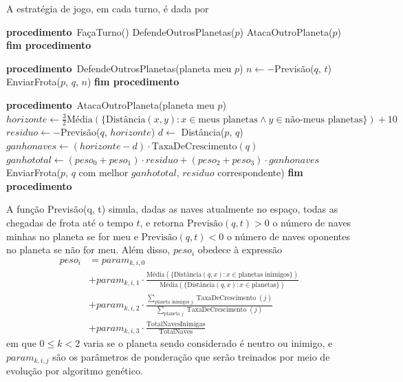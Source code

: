 \documentclass[a4paper,titlepage,11pt]{article}
\newcommand\PROC{\STATE\textbf{procedimento}\ }
\newcommand\ENDPROC{\STATE\textbf{fim procedimento}}
\begin{document}
A estratégia de jogo, em cada turno, é dada por

\begin{algorithmic}[1]
	\PROC FaçaTurno()
	\FORALL {planeta meu $p$}
		\STATE DefendeOutrosPlanetas($p$)
		\STATE AtacaOutroPlaneta($p$)
	\ENDFOR
	\ENDPROC
\end{algorithmic}
\begin{algorithmic}[1]
	\PROC DefendeOutrosPlanetas(planeta meu $p$)
			\STATE $n \gets  -$Previsão($q$, $t$)
				\STATE EnviarFrota($p$, $q$, $n$)
			\ENDIF
		\ENDIF
	\ENDFOR
	\ENDPROC
\end{algorithmic}
\begin{algorithmic}[1]
	\PROC AtacaOutroPlaneta(planeta meu $p$)
	\STATE $\displaystyle horizonte \gets \frac 3 2 \text{Média}(\{\text{Distância}(x, y) : x \in \text{meus planetas} \wedge y \in \text{não-meus planetas}\})+10$
			\STATE $residuo \gets -$Previsão($q$, $horizonte$)
			 \STATE {}
				\STATE $d \gets$ Distância($p$, $q$)
				\STATE $ganhonaves \gets (horizonte-d)\cdot\text{TaxaDeCrescimento}(q)$
				\STATE $ganhototal \gets (peso_0+peso_1) \cdot residuo + (peso_2+peso_3) \cdot ganhonaves$
			\ENDIF
		\ENDIF
	\ENDFOR
	\STATE EnviarFrota($p$, $q$ com melhor $ganhototal$, $residuo$ correspondente)
	\ENDPROC
\end{algorithmic}

A função Previsão(q, t)  simula, dadas as naves atualmente no espaço, todas as chegadas de frota até o tempo $t$, e retorna $\text{Previsão}(q, t) > 0$ o número de naves minhas no planeta se for meu e $\text{Previsão}(q, t) < 0$ o número de naves oponentes no planeta se não for meu. Além disso, $peso_i$ obedece à expressão
\begin{align*}
	peso_i &= param_{k,i,0} \\
		&+ param_{k,i,1}\cdot\frac{\text{Média}(\{\text{Distância}(q, x) : x \in \text{planetas inimigos}\})}{\text{Média}(\{\text{Distância}(q, x) : x \in \text{planetas}\})}\\
		&+ param_{k,i,2}\cdot\frac{\sum_{\text{planeta inimigos }j} \operatorname{TaxaDeCrescimento}(j)}{\sum_{\text{planeta }j} \operatorname{TaxaDeCrescimento}(j)}\\
		&+ param_{k,i,3}\cdot\frac{\text{TotalNavesInimigas}}{\text{TotalNaves}}
\end{align*}
em que $0 \leq k < 2$ varia se o planeta sendo considerado é neutro ou inimigo, e $param_{k,i,j}$ são os parâmetros de ponderação que serão treinados por meio de evolução por algoritmo genético.
\end{document}
